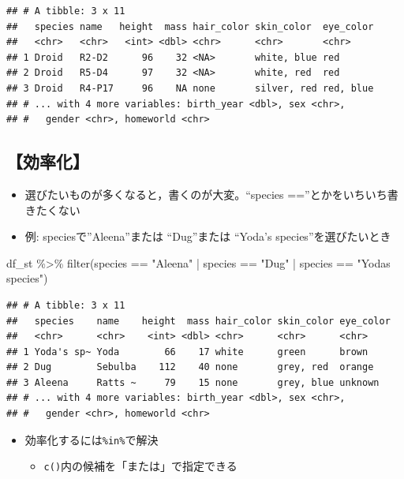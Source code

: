 \documentclass[
  xelatex,ja=standard, b5paper]{bxjsbook}
\newenvironment{Shaded}{\begin{snugshade}}{\end{snugshade}}
\newcommand{\FunctionTok}[1]{\textcolor[rgb]{0.00,0.00,0.00}{#1}}
\newcommand{\NormalTok}[1]{#1}
\newcommand{\SpecialCharTok}[1]{\textcolor[rgb]{0.00,0.00,0.00}{#1}}
\newcommand{\StringTok}[1]{\textcolor[rgb]{0.31,0.60,0.02}{#1}}
\providecommand{\tightlist}{%
  \setlength{\itemsep}{0pt}\setlength{\parskip}{0pt}}
\begin{document}
\begin{verbatim}
## # A tibble: 3 x 11
##   species name   height  mass hair_color skin_color  eye_color
##   <chr>   <chr>   <int> <dbl> <chr>      <chr>       <chr>    
## 1 Droid   R2-D2      96    32 <NA>       white, blue red      
## 2 Droid   R5-D4      97    32 <NA>       white, red  red      
## 3 Droid   R4-P17     96    NA none       silver, red red, blue
## # ... with 4 more variables: birth_year <dbl>, sex <chr>,
## #   gender <chr>, homeworld <chr>
\end{verbatim}

\hypertarget{filter-multi-eff}{%
\subsection{【効率化】}\label{filter-multi-eff}}

\begin{itemize}
\tightlist
\item
  選びたいものが多くなると，書くのが大変。``species ==''とかをいちいち書きたくない
\item
  例: speciesで''Aleena''または ``Dug''または ``Yoda's species''を選びたいとき
\end{itemize}

\begin{Shaded}
\begin{Highlighting}[]
\NormalTok{df\_st }\SpecialCharTok{\%\textgreater{}\%} 
  \FunctionTok{filter}\NormalTok{(species }\SpecialCharTok{==} \StringTok{"Aleena"} \SpecialCharTok{|}\NormalTok{ species }\SpecialCharTok{==} \StringTok{"Dug"} \SpecialCharTok{|} 
\NormalTok{         species }\SpecialCharTok{==} \StringTok{"Yoda\textquotesingle{}s species"}\NormalTok{)}
\end{Highlighting}
\end{Shaded}

\begin{verbatim}
## # A tibble: 3 x 11
##   species    name    height  mass hair_color skin_color eye_color
##   <chr>      <chr>    <int> <dbl> <chr>      <chr>      <chr>    
## 1 Yoda's sp~ Yoda        66    17 white      green      brown    
## 2 Dug        Sebulba    112    40 none       grey, red  orange   
## 3 Aleena     Ratts ~     79    15 none       grey, blue unknown  
## # ... with 4 more variables: birth_year <dbl>, sex <chr>,
## #   gender <chr>, homeworld <chr>
\end{verbatim}

\begin{itemize}
\tightlist
\item
  効率化するには\texttt{\%in\%}で解決

  \begin{itemize}
  \tightlist
  \item
    \texttt{c()}内の候補を「または」で指定できる
  \end{itemize}
\end{itemize}
\end{document}
